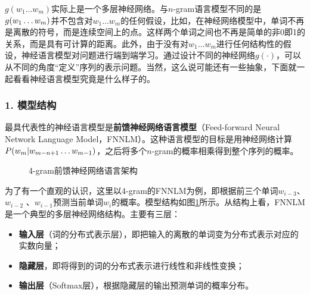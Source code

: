 \vspace{-0.4em}
\parinterval  $ g(w_1\dots w_m) $实际上是一个多层神经网络。与$n$-gram语言模型不同的是$ g(w_1\dots \\ w_m) $并不包含对$ w_1\dots w_m $的任何假设，比如，在神经网络模型中，单词不再是离散的符号，而是连续空间上的点。这样两个单词之间也不再是简单的非0即1的关系，而是具有可计算的距离。此外，由于没有对$ w_1\dots w_m $进行任何结构性的假设，神经语言模型对问题进行端到端学习。通过设计不同的神经网络$ g(\cdot)$，可以从不同的角度“定义”序列的表示问题。当然，这么说可能还有一些抽象，下面就一起看看神经语言模型究竟是什么样子的。


\subsubsection{1. 模型结构}

\parinterval  最具代表性的神经语言模型是{\small\sffamily\bfseries{前馈神经网络语言模型}}（Feed-forward Neural Network Language Model，FNNLM）。这种语言模型的目标是用神经网络计算$ {P}(w_m|w_{m-n+1}\dots w_{m-1}) $，之后将多个$n$-gram的概率相乘得到整个序列的概率。

\begin{figure}[htp]
\centering

\caption{4-gram前馈神经网络语言架构}
\label{fig:9-60}
\end{figure}

\parinterval  为了有一个直观的认识，这里以4-gram的FNNLM为例，即根据前三个单词$ w_{i-3} $、 $ w_{i-2} $ 、$ w_{i-1} $预测当前单词$ w_i $的概率。模型结构如图\ref{fig:9-60}所示。从结构上看，FNNLM是一个典型的多层神经网络结构。主要有三层：

\begin{itemize}
\vspace{0.3em}
\item {\small\sffamily\bfseries{输入层}}（词的分布式表示层），即把输入的离散的单词变为分布式表示对应的实数向量；
\vspace{0.3em}
\item {\small\sffamily\bfseries{隐藏层}}，即将得到的词的分布式表示进行线性和非线性变换；
\vspace{0.3em}
\item {\small\sffamily\bfseries{输出层}}（Softmax层），根据隐藏层的输出预测单词的概率分布。
\vspace{0.3em}
\end{itemize}

